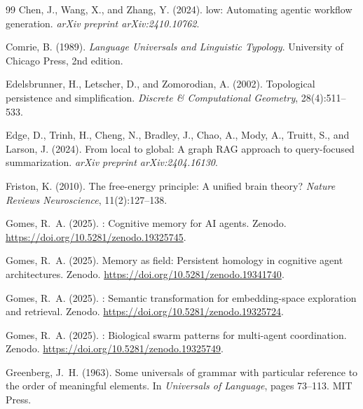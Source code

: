 \documentclass[11pt,a4paper]{article}
\begin{document}
\begin{thebibliography}{99}
Chen, J., Wang, X., and Zhang, Y. (2024).
low: Automating agentic workflow generation.
\newblock \emph{arXiv preprint arXiv:2410.10762}.

Comrie, B. (1989).
\newblock \emph{Language Universals and Linguistic Typology}.
\newblock University of Chicago Press, 2nd edition.

Edelsbrunner, H., Letscher, D., and Zomorodian, A. (2002).
\newblock Topological persistence and simplification.
\newblock \emph{Discrete \& Computational Geometry}, 28(4):511--533.

Edge, D., Trinh, H., Cheng, N., Bradley, J., Chao, A., Mody, A., Truitt, S., and Larson, J. (2024).
\newblock From local to global: A graph {RAG} approach to query-focused summarization.
\newblock \emph{arXiv preprint arXiv:2404.16130}.

Friston, K. (2010).
\newblock The free-energy principle: A unified brain theory?
\newblock \emph{Nature Reviews Neuroscience}, 11(2):127--138.

Gomes, R.~A. (2025{}).
: Cognitive memory for {AI} agents.
\newblock Zenodo. \url{https://doi.org/10.5281/zenodo.19325745}.

Gomes, R.~A. (2025{}).
\newblock Memory as field: Persistent homology in cognitive agent architectures.
\newblock Zenodo. \url{https://doi.org/10.5281/zenodo.19341740}.

Gomes, R.~A. (2025{}).
: Semantic transformation for embedding-space exploration and retrieval.
\newblock Zenodo. \url{https://doi.org/10.5281/zenodo.19325724}.

Gomes, R.~A. (2025{}).
: Biological swarm patterns for multi-agent coordination.
\newblock Zenodo. \url{https://doi.org/10.5281/zenodo.19325749}.

Greenberg, J.~H. (1963).
\newblock Some universals of grammar with particular reference to the order of meaningful elements.
\newblock In \emph{Universals of Language}, pages 73--113. MIT Press.


\end{thebibliography}
\end{document}
